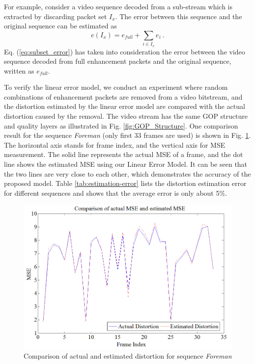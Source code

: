 \documentclass[journal]{IEEEtran}
\begin{document}
For example, consider a video sequence decoded from a sub-stream which is extracted by discarding packet set $I_x$. The error between this sequence and the original sequence can be estimated as
\begin{equation}
\label{eq:subset_error}
e(I_x) = e_{full} + \sum_{i \in {I_x}} e_i \: .
\end{equation}
Eq. (\ref{eq:subset_error}) has taken into consideration the error between the video sequence decoded from full enhancement packets and the original sequence, written as $e_{full}$.

To verify the linear error model, we conduct an experiment where random combinations of enhancement packets are removed from a video bitstream, and the distortion estimated by the linear error model are compared with the actual distortion caused by the removal. The video stream has the same GOP structure and quality layers as illustrated in Fig. \ref{fig:GOP_Structure}. One comparison result for the sequence {\em Foreman} (only first 33 frames are used) is shown in Fig. \ref{fig:model_verification}. The horizontal axis stands for frame index, and the vertical axis for MSE measurement. The solid line represents the actual MSE of a frame, and the dot line shows the estimated MSE using our Linear Error Model. It can be seen that the two lines are very close to each other, which demonstrates the accuracy of the proposed model. Table \ref{tab:estimation-error} lists the distortion estimation error for different sequences and shows that the average error is only about 5\%.

\begin{figure}[h]
\centering
\includegraphics[width = 1.0\linewidth]{ModelVerification.png}
\caption{Comparison of actual and estimated distortion for sequence {\em Foreman} \label{fig:model_verification}}
\end{figure}
\end{document}
